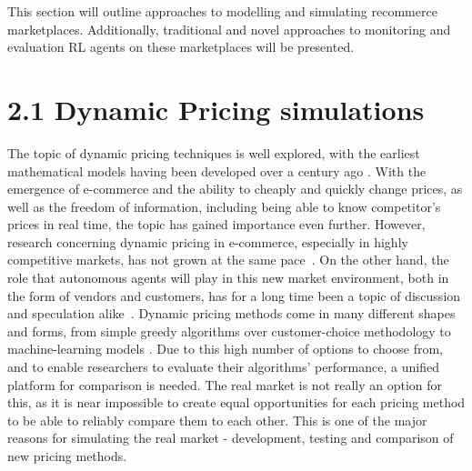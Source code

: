 \begin{jointwork}\label{ch:RelatedWork}
	This section will outline approaches to modelling and simulating recommerce marketplaces. Additionally, traditional and novel approaches to monitoring and evaluation RL agents on these marketplaces will be presented.
\end{jointwork}

\section*{2.1 Dynamic Pricing simulations}

The topic of dynamic pricing techniques is well explored, with the earliest mathematical models having been developed over a century ago \cite{DynamicPricingHistory}. With the emergence of e-commerce and the ability to cheaply and quickly change prices, as well as the freedom of information, including being able to know competitor's prices in real time, the topic has gained importance even further. However, research concerning dynamic pricing in e-commerce, especially in highly competitive markets, has not grown at the same pace~\cite{PricingEcommerceGrowth}. On the other hand, the role that autonomous agents will play in this new market environment, both in the form of vendors and customers, has for a long time been a topic of discussion and speculation alike~\cite{PricingBySoftwareAgents}. Dynamic pricing methods come in many different shapes and forms, from simple greedy algorithms over customer-choice methodology to machine-learning models \cite{deGeerPricing}. Due to this high number of options to choose from, and to enable researchers to evaluate their algorithms' performance, a unified platform for comparison is needed. The real market is not really an option for this, as it is near impossible to create equal opportunities for each pricing method to be able to reliably compare them to each other. This is one of the major reasons for simulating the real market - development, testing and comparison of new pricing methods.

